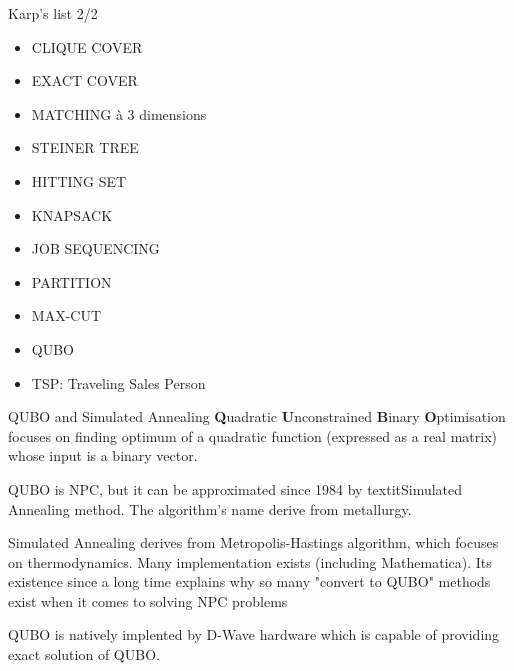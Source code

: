\begin{frame}{Karp's list 2/2}
\begin{itemize}
    \item CLIQUE COVER 
    \item EXACT COVER
    \item MATCHING à 3 dimensions 
    \item STEINER TREE 
    \item HITTING SET 
    \item KNAPSACK 
    \item JOB SEQUENCING 
    \item PARTITION 
    \item MAX-CUT 
    \item QUBO
    \item TSP: Traveling Sales Person
\end{itemize}    
\end{frame}

\begin{frame}{QUBO and Simulated Annealing}
\textbf{Q}uadratic \textbf{U}nconstrained \textbf{B}inary \textbf{O}ptimisation focuses on finding optimum of a 
quadratic function (expressed as a real matrix) whose input is a binary vector.
\newline

QUBO is NPC, but it can be approximated since 1984 by textit{Simulated Annealing} method. The algorithm's name 
derive from metallurgy. 
\newline

Simulated Annealing derives from Metropolis-Hastings algorithm, which focuses on thermodynamics. Many implementation
exists (including Mathematica). Its existence since a long time explains why so many "convert to QUBO" methods exist
when it comes to solving NPC problems
\newline

QUBO is natively implented by D-Wave hardware which is capable of providing exact solution of QUBO. 
\end{frame}




